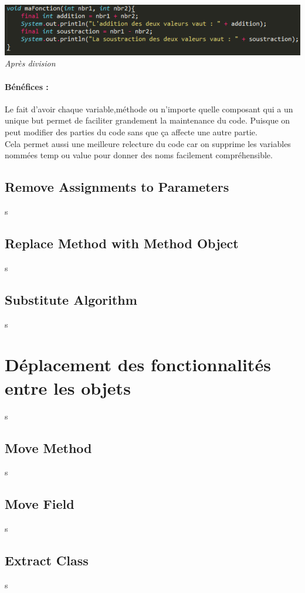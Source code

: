 \documentclass[a4paper,twoside,12pt,openright]{report}
\begin{document}
\begin{center}
\includegraphics[scale=1]{Image/Diviser_Temp2.png}\\
\itshape{Après division}
\end{center}

\paragraph{Bénéfices :}
Le fait d'avoir chaque variable,méthode ou n'importe quelle composant qui a un unique but permet de faciliter grandement la maintenance du code. Puisque on peut modifier des parties du code sans que ça affecte une autre partie.\\
Cela permet aussi une meilleure relecture du code car on supprime les variables nommées temp ou value pour donner des noms facilement compréhensible.

\subsection{Remove Assignments to Parameters}
s
\subsection{Replace Method with Method Object}
s
\subsection{Substitute Algorithm}
s



\newpage
\section{Déplacement des fonctionnalités entre les objets}
s
\subsection{Move Method}
s
\subsection{Move Field}
s
\subsection{Extract Class}
s
\end{document}
